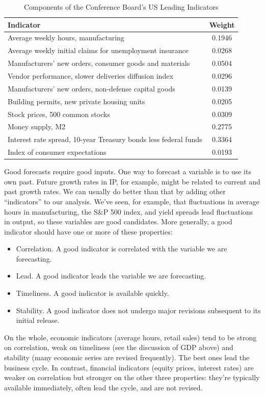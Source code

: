 \documentclass[letterpaper,12pt]{article}
\begin{document}
%
\begin{table}
\begin{center}
\begin{tabular}{lc}
\hline\hline Indicator   & Weight  \\
\hline\hline
Average weekly hours, manufacturing  &  0.1946  \\
Average weekly initial claims for unemployment insurance & 0.0268 \\
Manufacturers' new orders, consumer goods and materials & 0.0504
\\
Vendor performance, slower deliveries diffusion index &  0.0296
\\
Manufacturers' new orders, non-defense capital goods &  0.0139
\\
Building permits, new private housing units &  0.0205 \\
Stock prices, 500 common stocks &  0.0309 \\
Money supply, M2 & 0.2775 \\
Interest rate spread, 10-year Treasury bonds less federal funds &
0.3364 \\
Index of consumer expectations & 0.0193 \\
\hline\hline
\end{tabular}
\end{center}
\caption{Components of the Conference Board's US Leading
Indicators} \label{tab:lei}
\end{table}
%

Good forecasts require good inputs.  One way to forecast a
variable is to use its own past.  Future growth rates in IP, for
example, might be related to current and past growth rates. We can
usually do better than that by adding other ``indicators'' to our
analysis.  We've seen, for example, that fluctuations in average
hours in manufacturing, the S\&P 500 index, and yield spreads lead
fluctuations in output, so these variables are good candidates.
More generally, a good indicator should have one or more of these
properties:
%
\begin{itemize}

\item Correlation.  A good indicator is correlated with the
variable we are forecasting.

\item Lead. A good indicator leads the variable we are
forecasting.

\item Timeliness.  A good indicator is available quickly.

\item Stability.  A good indicator does not undergo major
revisions subsequent to its initial release.

\end{itemize}
On the whole, economic indicators (average hours, retail sales)
tend to be strong on correlation, weak on timeliness (see the
discussion of GDP above) and stability (many economic series are
revised frequently). The best ones lead the business cycle.  In
contrast, financial indicators (equity prices, interest rates) are
weaker on correlation but stronger on the other three properties:
they're typically available immediately, often lead the cycle, and
are not revised.
\end{document}
